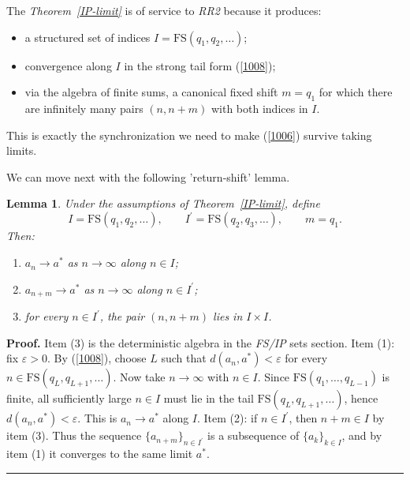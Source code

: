 \documentclass[onecolumn]{article}
\newtheorem{lemma}[theorem]{Lemma}
\newenvironment{proof}[1][Proof]{\noindent\textbf{#1.} }{\ \rule{0.5em}{0.5em}}
\begin{document}
\noindent The \textit{Theorem~\ref{IP-limit}} is of service to \textit{RR2}
because it produces:

\begin{itemize}
\item a structured set of indices $I=\mathrm{FS}(q_1,q_2,\dots)$;

\item convergence along $I$ in the strong tail form (\ref{1008});

\item via the algebra of finite sums, a canonical fixed shift $m=q_{1}$ for
which there are infinitely many pairs $(n,n+m)$ with both indices in $I$.
\end{itemize}

This is exactly the synchronization we need to make (\ref{1006}) survive
taking limits.

\medskip We can move next with the following 'return-shift' lemma.

\begin{lemma}
\label{return-shift} Under the assumptions of Theorem~\ref{IP-limit}, define 
\begin{equation}
I=\mathrm{FS}(q_{1},q_{2},\dots ),\qquad I^{\prime }=\mathrm{FS}%
(q_{2},q_{3},\dots ),\qquad m=q_{1}.  \label{1009}
\end{equation}%
Then:

\begin{enumerate}
\item $a_{n}\rightarrow a^{\ast }$ as $n\rightarrow \infty $ along $n\in I$;

\item $a_{n+m}\rightarrow a^{\ast }$ as $n\rightarrow \infty $ along $n\in
I^{\prime }$;

\item for every $n\in I^{\prime }$, the pair $(n,n+m)$ lies in $I\times I$.
\end{enumerate}
\end{lemma}

\begin{proof}
\smallskip Item (3) is the deterministic algebra in the \textit{FS/IP} sets
section. Item (1): fix $\varepsilon >0$. By (\ref{1008}), choose $L$ such
that $d(a_{n},a^{\ast })<\varepsilon $ for every $n\in \mathrm{FS}%
(q_{L},q_{L+1},\dots )$. Now take $n\rightarrow \infty $ with $n\in I$.
Since $\mathrm{FS}(q_{1},\dots ,q_{L-1})$ is finite, all sufficiently large $%
n\in I$ must lie in the tail $\mathrm{FS}(q_{L},q_{L+1},\dots )$, hence $%
d(a_{n},a^{\ast })<\varepsilon $. This is $a_{n}\rightarrow a^{\ast }$ along 
$I$. Item (2): if $n\in I^{\prime }$, then $n+m\in I$ by item (3). Thus the
sequence $\{a_{n+m}\}_{n\in I^{\prime }}$ is a subsequence of $%
\{a_{k}\}_{k\in I}$, and by item (1) it converges to the same limit $a^{\ast
}$.\hfill
\end{proof}
\end{document}
